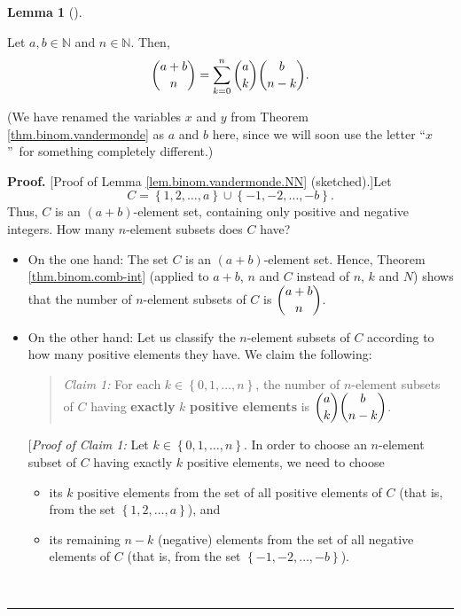 \documentclass[numbers=enddot,12pt,final,onecolumn,notitlepage]{scrartcl}%
\numberwithin{exer}{subsection}
\theoremstyle{definition}
\newtheorem{lem}[theo]{Lemma}
\newenvironment{lemma}[1][]
{\begin{lem}[#1]\begin{leftbar}}
{\end{leftbar}\end{lem}}
\newenvironment{statement}{\begin{quote}}{\end{quote}}
\newenvironment{proof}[1][Proof]{\noindent\textbf{#1.} }{\ \rule{0.5em}{0.5em}}
\let\sumnonlimits\sum
\renewcommand{\sum}{\sumnonlimits\limits}
\begin{document}
\begin{lemma}
\label{lem.binom.vandermonde.NN}Let $a,b\in\mathbb{N}$ and $n\in\mathbb{N}$.
Then,%
\[
\dbinom{a+b}{n}=\sum_{k=0}^{n}\dbinom{a}{k}\dbinom{b}{n-k}.
\]

\end{lemma}

(We have renamed the variables $x$ and $y$ from Theorem
\ref{thm.binom.vandermonde} as $a$ and $b$ here, since we will soon use the
letter \textquotedblleft$x$\textquotedblright\ for something completely different.)

\begin{proof}
[Proof of Lemma \ref{lem.binom.vandermonde.NN} (sketched).]Let%
\[
C=\left\{  1,2,\ldots,a\right\}  \cup\left\{  -1,-2,\ldots,-b\right\}  .
\]
Thus, $C$ is an $\left(  a+b\right)  $-element set, containing only positive
and negative integers. How many $n$-element subsets does $C$ have?

\begin{itemize}
\item On the one hand: The set $C$ is an $\left(  a+b\right)  $-element set.
Hence, Theorem \ref{thm.binom.comb-int} (applied to $a+b$, $n$ and $C$ instead
of $n$, $k$ and $N$) shows that the number of $n$-element subsets of $C$ is
$\dbinom{a+b}{n}$.

\item On the other hand: Let us classify the $n$-element subsets of $C$
according to how many positive elements they have. We claim the following:

\begin{statement}
\textit{Claim 1:} For each $k\in\left\{  0,1,\ldots,n\right\}  $, the number
of $n$-element subsets of $C$ having \textbf{exactly }$k$ \textbf{positive
elements} is $\dbinom{a}{k}\dbinom{b}{n-k}$.
\end{statement}

[\textit{Proof of Claim 1:} Let $k\in\left\{  0,1,\ldots,n\right\}  $. In
order to choose an $n$-element subset of $C$ having exactly $k$ positive
elements, we need to choose

\begin{itemize}
\item its $k$ positive elements from the set of all positive elements of $C$
(that is, from the set $\left\{  1,2,\ldots,a\right\}  $), and

\item its remaining $n-k$ (negative) elements from the set of all negative
elements of $C$ (that is, from the set $\left\{  -1,-2,\ldots,-b\right\}  $).
\end{itemize}


\end{itemize}
\end{proof}
\end{document}
